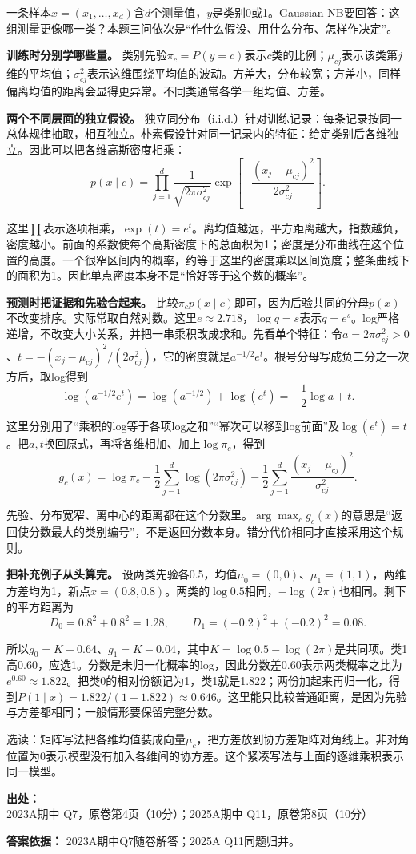 一条样本\(x=(x_1,\ldots,x_d)\)含\(d\)个测量值，\(y\)是类别0或1。Gaussian NB要回答：这组测量更像哪一类？本题三问依次是“作什么假设、用什么分布、怎样作决定”。


\textbf{训练时分别学哪些量。} 类别先验\(\pi_c=P(y=c)\)表示\(c\)类的比例；\(\mu_{cj}\)表示该类第\(j\)维的平均值；\(\sigma^2_{cj}\)表示这维围绕平均值的波动。方差大，分布较宽；方差小，同样偏离均值的距离会显得更异常。不同类通常各学一组均值、方差。


\textbf{两个不同层面的独立假设。} 独立同分布（i.i.d.）针对训练记录：每条记录按同一总体规律抽取，相互独立。朴素假设针对同一记录内的特征：给定类别后各维独立。因此可以把各维高斯密度相乘：
\[
p(x\mid c)=\prod_{j=1}^d\frac{1}{\sqrt{2\pi\sigma_{cj}^2}}
\exp\left[-\frac{(x_j-\mu_{cj})^2}{2\sigma_{cj}^2}\right].
\]


这里\(\prod\)表示逐项相乘，\(\exp(t)=e^t\)。离均值越远，平方距离越大，指数越负，密度越小。前面的系数使每个高斯密度下的总面积为1；密度是分布曲线在这个位置的高度。一个很窄区间内的概率，约等于这里的密度乘以区间宽度；整条曲线下的面积为1。因此单点密度本身不是“恰好等于这个数的概率”。


\textbf{预测时把证据和先验合起来。} 比较\(\pi_c p(x\mid c)\)即可，因为后验共同的分母\(p(x)\)不改变排序。实际常取自然对数。这里\(e\approx2.718\)，\(\log q=s\)表示\(q=e^s\)。log严格递增，不改变大小关系，并把一串乘积改成求和。先看单个特征：令\(a=2\pi\sigma_{cj}^2>0\)、\(t=-(x_j-\mu_{cj})^2/(2\sigma_{cj}^2)\)，它的密度就是\(a^{-1/2}e^t\)。根号分母写成负二分之一次方后，取log得到
\[
\log(a^{-1/2}e^t)
=\log(a^{-1/2})+\log(e^t)
=-\frac12\log a+t.
\]


这里分别用了“乘积的log等于各项log之和”“幂次可以移到log前面”及\(\log(e^t)=t\)。把\(a,t\)换回原式，再将各维相加、加上\(\log\pi_c\)，得到
\[
g_c(x)=\log\pi_c-\frac12\sum_{j=1}^d\log(2\pi\sigma_{cj}^2)
-\frac12\sum_{j=1}^d\frac{(x_j-\mu_{cj})^2}{\sigma_{cj}^2}.
\]


先验、分布宽窄、离中心的距离都在这个分数里。\(\arg\max_c g_c(x)\)的意思是“返回使分数最大的类别编号”，不是返回分数本身。错分代价相同才直接采用这个规则。


\textbf{把补充例子从头算完。} 设两类先验各0.5，均值\(\mu_0=(0,0)\)、\(\mu_1=(1,1)\)，两维方差均为1，新点\(x=(0.8,0.8)\)。两类的\(\log0.5\)相同，\(-\log(2\pi)\)也相同。剩下的平方距离为
\[
D_0=0.8^2+0.8^2=1.28,\qquad D_1=(-0.2)^2+(-0.2)^2=0.08.
\]


所以\(g_0=K-0.64\)、\(g_1=K-0.04\)，其中\(K=\log0.5-\log(2\pi)\)是共同项。类1高0.60，应选1。分数是未归一化概率的log，因此分数差0.60表示两类概率之比为\(e^{0.60}\approx1.822\)。把类0的相对份额记为1，类1就是1.822；两份加起来再归一化，得到\(P(1\mid x)=1.822/(1+1.822)\approx0.646\)。这里能只比较普通距离，是因为先验与方差都相同；一般情形要保留完整分数。


选读：矩阵写法把各维均值装成向量\(\mu_c\)，把方差放到协方差矩阵对角线上。非对角位置为0表示模型没有加入各维间的协方差。这个紧凑写法与上面的逐维乘积表示同一模型。


\textbf{出处：} 2023A期中 Q7，原卷第4页（10分）；2025A期中 Q11，原卷第8页（10分）


\textbf{答案依据：} 2023A期中Q7随卷解答；2025A Q11同题归并。
